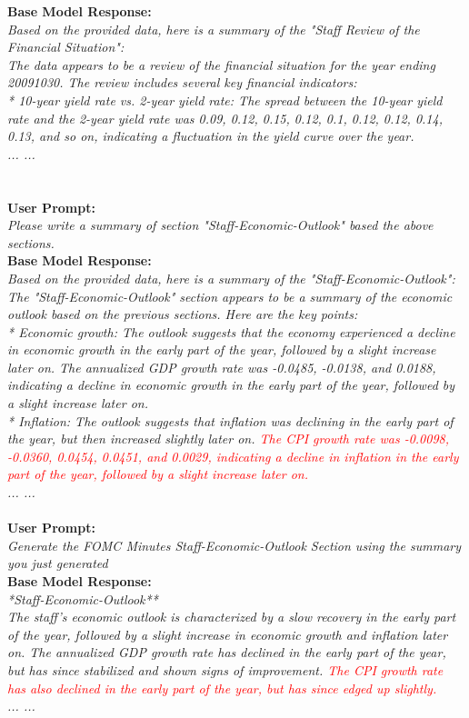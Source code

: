 \textbf{Base Model Response:}\\
{\footnotesize
\textit{
    Based on the provided data, here is a summary of the "Staff Review of the Financial Situation":\\
    The data appears to be a review of the financial situation for the year ending 20091030. The review includes several key financial indicators:\\
    * 10-year yield rate vs. 2-year yield rate: The spread between the 10-year yield rate and the 2-year yield rate was 0.09, 0.12, 0.15, 0.12, 0.1, 0.12, 0.12, 0.14, 0.13, and so on, indicating a fluctuation in the yield curve over the year.\\
    ... ...\\
}}\\
~\\
\textbf{User Prompt:}\\
{\footnotesize
\textit{
    Please write a summary of section "Staff-Economic-Outlook" based the above sections.
}}\\
\textbf{Base Model Response:}\\
{\footnotesize
\textit{
    Based on the provided data, here is a summary of the "Staff-Economic-Outlook":\\
    The "Staff-Economic-Outlook" section appears to be a summary of the economic outlook based on the previous sections. Here are the key points:\\
    * Economic growth: The outlook suggests that the economy experienced a decline in economic growth in the early part of the year, followed by a slight increase later on. The annualized GDP growth rate was -0.0485, -0.0138, and 0.0188, indicating a decline in economic growth in the early part of the year, followed by a slight increase later on.\\
    * Inflation: The outlook suggests that inflation was declining in the early part of the year, but then increased slightly later on. \textcolor{red}{The CPI growth rate was -0.0098, -0.0360, 0.0454, 0.0451, and 0.0029, indicating a decline in inflation in the early part of the year, followed by a slight increase later on.}\\
    ... ...
}}\\
~\\
\textbf{User Prompt:}\\
{\footnotesize
\textit{Generate the FOMC Minutes Staff-Economic-Outlook Section using the summary you just generated}}\\
\textbf{Base Model Response:}\\
{\footnotesize
\textit{
    *Staff-Economic-Outlook**\\
The staff's economic outlook is characterized by a slow recovery in the early part of the year, followed by a slight increase in economic growth and inflation later on. The annualized GDP growth rate has declined in the early part of the year, but has since stabilized and shown signs of improvement. \textcolor{red}{The CPI growth rate has also declined in the early part of the year, but has since edged up slightly.} \\
... ... 
}}\\
~\\



